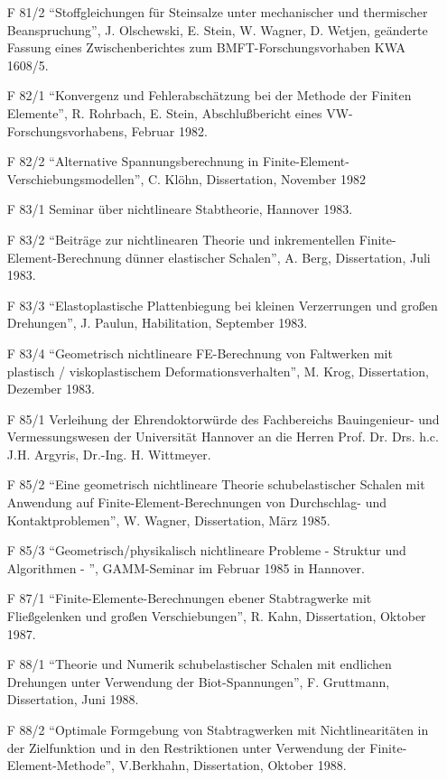 \begin{itemize}
    \item[F 81/2] ``Stoffgleichungen für Steinsalze unter mechanischer und thermischer Beanspruchung”, J. Olschewski, E. Stein, W. Wagner, D. Wetjen, geänderte Fassung eines Zwischenberichtes zum BMFT-Forschungsvorhaben KWA 1608/5.
    \item[F 82/1] ``Konvergenz und Fehlerabschätzung bei der Methode der Finiten Elemente”, R. Rohrbach, E. Stein, Abschlußbericht eines VW- Forschungsvorhabens, Februar 1982.
    \item[F 82/2] ``Alternative Spannungsberechnung in Finite-Element- Verschiebungsmodellen”, C. Klöhn, Dissertation, November 1982
    \item[F 83/1] Seminar über nichtlineare Stabtheorie, Hannover 1983.
    \item[F 83/2] ``Beiträge zur nichtlinearen Theorie und inkrementellen Finite- Element-Berechnung dünner elastischer Schalen”, A. Berg, Dissertation, Juli 1983.
    \item[F 83/3] ``Elastoplastische Plattenbiegung bei kleinen Verzerrungen und großen Drehungen”, J. Paulun, Habilitation, September 1983.
    \item[F 83/4] ``Geometrisch nichtlineare FE-Berechnung von Faltwerken mit plastisch / viskoplastischem Deformationsverhalten”, M. Krog, Dissertation, Dezember 1983.
    \item[F 85/1] Verleihung der Ehrendoktorwürde des Fachbereichs Bauingenieur- und Vermessungswesen der Universität Hannover an die Herren Prof. Dr. Drs. h.c. J.H. Argyris, Dr.-Ing. H. Wittmeyer.
    \item[F 85/2] ``Eine geometrisch nichtlineare Theorie schubelastischer Schalen mit Anwendung auf Finite-Element-Berechnungen von Durchschlag- und Kontaktproblemen”, W. Wagner, Dissertation, März 1985.
    \item[F 85/3] ``Geometrisch/physikalisch nichtlineare Probleme - Struktur und Algorithmen - ”, GAMM-Seminar im Februar 1985 in Hannover.
    \item[F 87/1] ``Finite-Elemente-Berechnungen ebener Stabtragwerke mit Fließgelenken und großen Verschiebungen”, R. Kahn, Dissertation, Oktober 1987.
    \item[F 88/1] ``Theorie und Numerik schubelastischer Schalen mit endlichen Drehungen unter Verwendung der Biot-Spannungen”, F. Gruttmann, Dissertation, Juni 1988.
    \item[F 88/2] ``Optimale Formgebung von Stabtragwerken mit Nichtlinearitäten in der Zielfunktion und in den Restriktionen unter Verwendung der Finite-Element-Methode”, V.Berkhahn, Dissertation, Oktober 1988.

\end{itemize}
